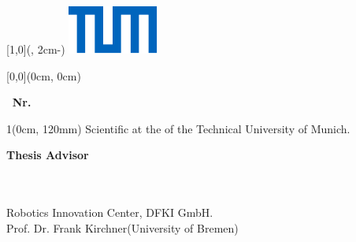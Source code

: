 \thispagestyle{empty}
\phantom{Hi mom!} %
\textblockorigin{\SeitenrandLinks}{\SeitenrandOben} %

{\sffamily

\begin{textblock*}{\UniversitaetLogoBreite}[1,0](\textwidth-1mm, 2cm-\SeitenrandOben)%
    \raggedleft\includegraphics{./00_Settings/TUM_Logo_RGB.pdf}%
\end{textblock*}



\begin{textblock*}{\textwidth}[0,0](0cm, 0cm)%
{\fontsize{24pt}{26pt}\selectfont\textbf{\thema}}


\vspace*{14pt}
{\fontsize{18pt}{27pt}\selectfont\textbf{\artderarbeit \, Nr. \, \arbeitnr}}
\end{textblock*}



\begin{textblock*}{1\textwidth}(0cm, 120mm)
	\fontsize{15pt}{17.5pt}\selectfont%
	Scientific %
	at the \fakultaet{} \ifthenelse{\equal{\studiengang}{}}{\\}{}%
	of the Technical University of Munich.
	
	\renewcommand{\baselinestretch}{1}
	\normalsize\selectfont
	\vspace*{12mm}
	\textbf{Thesis Advisor}\tab\hspace{-3cm}
	\begin{minipage}[t]{\textwidth-\CurrentLineWidth}
		\themenstellerlehrstuhl\\
		\themensteller \\
		Robotics Innovation Center, DFKI GmbH. \\
		Prof. Dr. Frank Kirchner(University of Bremen)
	\end{minipage}
	

\end{textblock*}}
